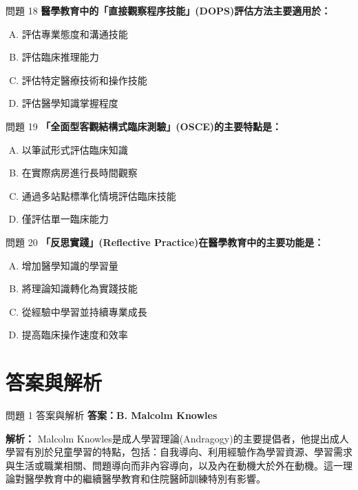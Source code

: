\documentclass[aspectratio=169]{beamer}
\begin{document}
\begin{frame}{問題 18}
  \textbf{醫學教育中的「直接觀察程序技能」(DOPS)評估方法主要適用於：}
  \begin{enumerate}[A.]
    \item 評估專業態度和溝通技能
    \item 評估臨床推理能力
    \item 評估特定醫療技術和操作技能
    \item 評估醫學知識掌握程度
  \end{enumerate}
\end{frame}

\begin{frame}{問題 19}
  \textbf{「全面型客觀結構式臨床測驗」(OSCE)的主要特點是：}
  \begin{enumerate}[A.]
    \item 以筆試形式評估臨床知識
    \item 在實際病房進行長時間觀察
    \item 通過多站點標準化情境評估臨床技能
    \item 僅評估單一臨床能力
  \end{enumerate}
\end{frame}

\begin{frame}{問題 20}
  \textbf{「反思實踐」(Reflective Practice)在醫學教育中的主要功能是：}
  \begin{enumerate}[A.]
    \item 增加醫學知識的學習量
    \item 將理論知識轉化為實踐技能
    \item 從經驗中學習並持續專業成長
    \item 提高臨床操作速度和效率
  \end{enumerate}
\end{frame}

\section{答案與解析}

\begin{frame}{問題 1 答案與解析}
  \textbf{答案：B. Malcolm Knowles}
  
  \textbf{解析：} Malcolm Knowles是成人學習理論(Andragogy)的主要提倡者，他提出成人學習有別於兒童學習的特點，包括：自我導向、利用經驗作為學習資源、學習需求與生活或職業相關、問題導向而非內容導向，以及內在動機大於外在動機。這一理論對醫學教育中的繼續醫學教育和住院醫師訓練特別有影響。
\end{frame}
\end{document}
